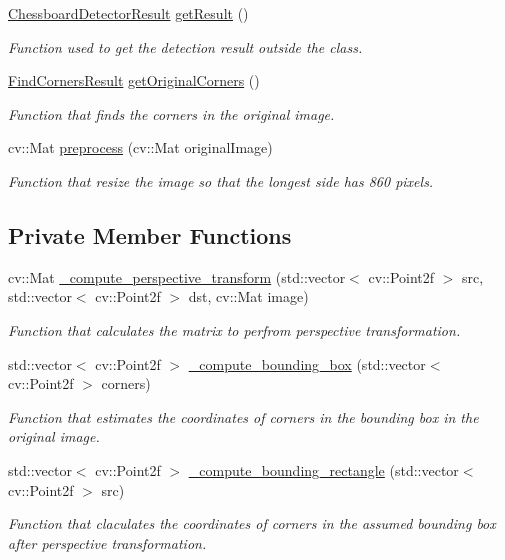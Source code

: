 \begin{DoxyCompactItemize}
\hyperlink{struct_chessboard_detector_result}{Chessboard\+Detector\+Result} \hyperlink{class_chessboard_detector_a84f8880402d0829ed6fc13ed45a141c4}{get\+Result} ()
\begin{DoxyCompactList}\small\item\em Function used to get the detection result outside the class. \end{DoxyCompactList}\item 
\hyperlink{struct_find_corners_result}{Find\+Corners\+Result} \hyperlink{class_chessboard_detector_a7f8fd52d9bb23984c0db1c4115e75043}{get\+Original\+Corners} ()
\begin{DoxyCompactList}\small\item\em Function that finds the corners in the original image. \end{DoxyCompactList}\item 
cv\+::\+Mat \hyperlink{class_chessboard_detector_a5860832e43410d526daf7415e5775aa9}{preprocess} (cv\+::\+Mat original\+Image)
\begin{DoxyCompactList}\small\item\em Function that resize the image so that the longest side has 860 pixels. \end{DoxyCompactList}\end{DoxyCompactItemize}
\subsection*{Private Member Functions}
\begin{DoxyCompactItemize}
\item 
cv\+::\+Mat \hyperlink{class_chessboard_detector_aab8f57b255da1d014e58d5e7aa984a3e}{\+\_\+compute\+\_\+perspective\+\_\+transform} (std\+::vector$<$ cv\+::\+Point2f $>$ src, std\+::vector$<$ cv\+::\+Point2f $>$ dst, cv\+::\+Mat image)
\begin{DoxyCompactList}\small\item\em Function that calculates the matrix to perfrom perspective transformation. \end{DoxyCompactList}\item 
std\+::vector$<$ cv\+::\+Point2f $>$ \hyperlink{class_chessboard_detector_af5ce25d1aa585ee9b48e705ddd9c0da1}{\+\_\+compute\+\_\+bounding\+\_\+box} (std\+::vector$<$ cv\+::\+Point2f $>$ corners)
\begin{DoxyCompactList}\small\item\em Function that estimates the coordinates of corners in the bounding box in the original image. \end{DoxyCompactList}\item 
std\+::vector$<$ cv\+::\+Point2f $>$ \hyperlink{class_chessboard_detector_a8de461985954069f87c868a930f81f2d}{\+\_\+compute\+\_\+bounding\+\_\+rectangle} (std\+::vector$<$ cv\+::\+Point2f $>$ src)
\begin{DoxyCompactList}\small\item\em Function that claculates the coordinates of corners in the assumed bounding box after perspective transformation. \end{DoxyCompactList}\end{DoxyCompactItemize}

